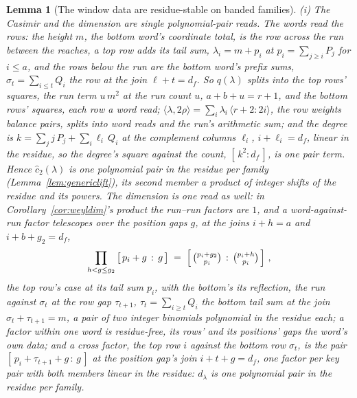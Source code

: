 \documentclass[11pt]{article}
\newtheorem{lemma}{Lemma}
\theoremstyle{definition}
\begin{document}
\begin{lemma}[The window data are residue-stable on banded families]
\emph{(i) The Casimir and the dimension are single polynomial-pair
reads.} The
words read the rows: the \emph{height} $m$, the bottom word's
coordinate total, is the row across the run between the reaches, a
top row adds its tail sum, $\lambda_i=m+p_i$ at
$p_i=\sum_{j\ge i}P_j$ for $i\le a$, and the rows below the run
are the bottom word's prefix sums, $\sigma_t=\sum_{i\le t}Q_i$
the row at the join $\ell+t=d_f$. So $q(\lambda)$ splits into the
top rows' squares, the run term $u\,m^2$ at the \emph{run count}
$u$, $a+b+u=r+1$, and the
bottom rows' squares, each row a word read;
$\langle\lambda,2\rho\rangle=\sum_i\lambda_i\,\langle
r+2\!:\!2i\rangle$, the row weights balance pairs, splits into
word reads and the run's arithmetic sum; and the degree is
$k=\sum_j j\,P_j+\sum_i \ell_i\,Q_i$ at the complement columns
$\ell_i$, $i+\ell_i=d_f$, linear in the residue, so
the degree's square against the count, $[\,k^2:d_f\,]$, is one pair
term. Hence
$\hat c_2(\lambda)$ is one polynomial pair in the residue per family
(Lemma~\ref{lem:genericlift}), its
second member a product of integer shifts of the residue and its
powers. The dimension is one
read as well:
in Corollary~\ref{cor:weyldim}'s product the run--run factors are
$1$, and a word-against-run factor telescopes over the position gaps
$g$, at the joins $i+h=a$ and $i+b+g_2=d_f$,
\[
\prod_{h<g\le g_2}\big[\,p_i+g\,:\,g\,\big]
\;=\;\Big[\,\tbinom{p_i+g_2}{p_i}\,:\,\tbinom{p_i+h}{p_i}\,\Big]\ ,
\]
the top row's case at its tail sum $p_i$, with the bottom's its
reflection, the run against $\sigma_t$ at the row gap $\tau_{t+1}$,
$\tau_t=\sum_{i\ge t}Q_i$ the bottom tail sum at the join
$\sigma_t+\tau_{t+1}=m$, a pair of two integer binomials
polynomial in the residue each; a factor within one word is
residue-free, its rows' and its positions' gaps the word's own
data; and a cross factor, the top row $i$ against the bottom row
$\sigma_t$, is the pair $[\,p_i+\tau_{t+1}+g\,:\,g\,]$ at the
position gap's join $i+t+g=d_f$, one factor per key pair with
both members linear in the residue: $d_\lambda$ is one polynomial
pair in the residue per family.


\end{lemma}
\end{document}
